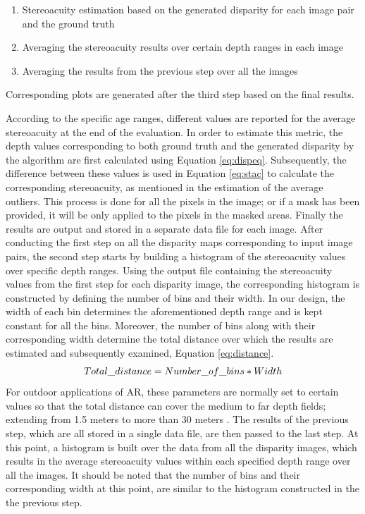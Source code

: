 \begin{enumerate}
\item Stereoacuity estimation based on the generated disparity for each image pair and the ground truth
\item Averaging the stereoacuity results over certain depth ranges in each image
\item Averaging the results from the previous step over all the images
\end{enumerate}
Corresponding plots are generated after the third step based on the final results.

According to the specific age ranges, different values are reported for the average stereoacuity
at the end of the evaluation. 
In order to estimate this metric, the depth values corresponding to both ground truth and the generated disparity by the algorithm are first
calculated using Equation \ref{eq:dispeq}. Subsequently, the difference between these values is used in Equation \ref{eq:stac} to calculate
the corresponding stereoacuity, as mentioned in the estimation of the average outliers. This process is done for all the pixels in the image; or if a mask has been provided, 
it will be only applied to the pixels in the masked areas. Finally the results are output and stored in a separate data file for each image.
After conducting the first step on all the disparity maps corresponding to input image pairs, the second step starts by building a histogram of
the stereoacuity values over specific depth ranges. Using the output file containing the stereoacuity values 
from the first step for each disparity image, the corresponding histogram is constructed by defining the number of bins and their width.
In our design, the width of each bin determines the aforementioned depth range and is kept constant for all the bins.
Moreover, the number of bins along with their corresponding width determine the total distance over which the results
are estimated and subsequently examined, Equation \ref{eq:distance}.
\begin{equation}
\label{eq:distance}
\centering
Total\_distance = Number\_of\_bins * Width
\end{equation}
For outdoor applications of AR, these parameters are normally set to certain values so that the total distance can cover the medium to far 
depth fields; extending from 1.5 meters to more than 30 meters \cite{swa07}.
The results of the previous step, which are all stored in a single data file, are then passed to the last step. 
At this point, a histogram is built over the data from all the disparity images, which results in the average stereoacuity
values within each specified depth range over all the images. 
It should be noted that the number of bins and their corresponding width at this point, are
similar to the histogram constructed in the the previous step.

